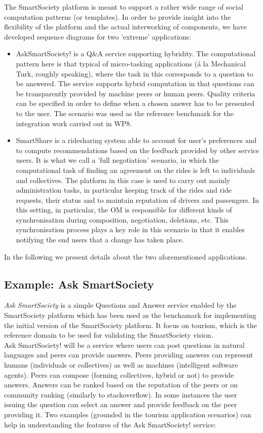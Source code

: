 The SmartSociety platform is meant to support a rather wide range of
social computation patterns (or templates). In order to provide
insight into the flexibility of the platform and the actual
interworking of components, we have developed sequence diagrams for two
'extreme' applications:
\begin{itemize}
\item AskSmartSociety! is a Q\&A service supporting hybridity. The
computational pattern here is that typical of micro-tasking
applications (\'a la Mechanical Turk, roughly speaking), where the
task in this corresponds to a question to be answered. The service
supports hybrid computation in that questions can be transparently
provided by machine peers or human peers. Quality criteria can be
specified in order to define when a chosen answer has to be presented
to the user. The scenario was used as the reference benchmark for the integration work carried out in WP8.

\item SmartShare is a ridesharing system able to account for user's
preferences and to compute recommendations based on the feedback
provided by other service users. It is what we call a 'full
negotiation' scenario, in which the computational task of finding an
agreement on the rides is left to individuals and collectives. The
platform in this case is used to carry out mainly administration tasks, in
particular keeping track of the rides and ride requests, their status
and to maintain reputation of drivers and passengers. In this setting, in particular, the OM is responsible for different kinds of synchronisation during composition, negotiation, deletions, etc. This synchronisation process plays a key role in this scenario in that it enables notifying the end users that a change has taken place. 
\end{itemize}
In the following we present details about the two aforementioned
applications. 


\subsection{Example: Ask SmartSociety}\label{sec:asksmartsoc}
\textit{Ask SmartSociety} is a simple Questions and Answer service enabled by the SmartSociety platform which has been used as the benchamark for implementing the initial version of the SmartSociety platform. It focus on tourism, which is the reference domain to be used for validating the SmartSociety vision.\\
Ask SmartSociety! will be a service where users can post questions in natural languages and peers can provide answers. Peers providing answers can represent humans (individuals or collectives) as well as machines (intelligent software agents). Peers can compose (forming collectives, hybrid or not) to provide answers. Answers can be ranked based on the reputation of the peers or on community ranking (similarly to stackoverflow). In some instances the user issuing the question can select an answer and provide feedback on the peer providing it.
Two examples (grounded in the tourism application scenarios) can help in understanding the features of the Ask SmartSociety! service:

